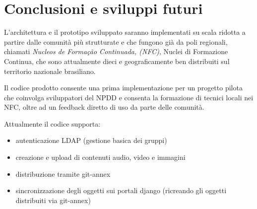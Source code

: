 
\chapter{Conclusioni e sviluppi futuri}
\label{Capitolo5}

L'architettura e il prototipo sviluppato saranno implementati su scala
ridotta a partire dalle comunità più strutturate e che fungono già da
poli regionali, chiamati \emph{Nucleos de Formação Continuada, (NFC)},
Nuclei di Formazione Continua, che sono attualmente dieci e
geograficamente ben distribuiti sul territorio nazionale brasiliano.

Il codice prodotto consente una prima implementazione per un progetto
pilota che coinvolga sviluppatori del NPDD e consenta la formazione di
tecnici locali nei NFC, oltre ad un feedback diretto di uso da parte
delle comunità. 

Attualmente il codice supporta:
\begin{itemize}
\item autenticazione LDAP (gestione basica dei gruppi)
\item creazione e upload di contenuti audio, video e immagini
\item distribuzione tramite git-annex
\item sincronizzazione degli oggetti sui portali django (ricreando gli
  oggetti distribuiti via git-annex)
\end{itemize}

